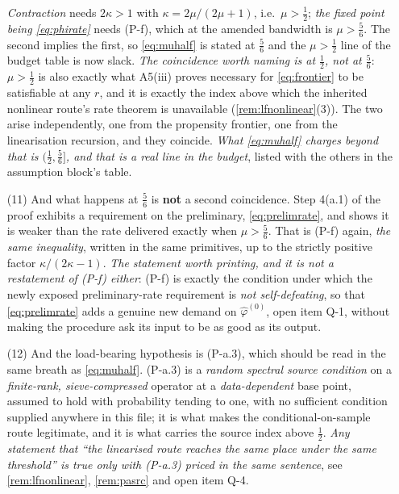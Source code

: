 \begin{remark}
\begin{enumerate}
\emph{Contraction} needs $2\kappa>1$ with $\kappa=2\mu/(2\mu+1)$, i.e.\ $\mu>\tfrac12$; \emph{the fixed
point being \eqref{eq:phirate}} needs (P-f), which at the amended bandwidth is $\mu>\tfrac56$. The second
implies the first, so \eqref{eq:muhalf} is stated at $\tfrac56$ and the $\mu>\tfrac12$ line of the budget
table is now slack. \emph{The coincidence worth naming is at $\tfrac12$, not at $\tfrac56$}:
$\mu>\tfrac12$ is also exactly what A5(iii) proves necessary for \eqref{eq:frontier} to be satisfiable at
any $r$, and it is exactly the index above which the inherited nonlinear route's rate theorem is
unavailable (\cref{rem:lfnonlinear}(3)). The two arise independently, one from the propensity
frontier, one from the linearisation recursion, and they coincide. \emph{What \eqref{eq:muhalf}
charges beyond that is $(\tfrac12,\tfrac56]$, and that is a real line in the budget}, listed with the
others in the assumption block's table.
\item[(11)] And what happens at $\tfrac56$ is \textbf{not} a second coincidence. Step 4(a.1) of
the proof exhibits a requirement on the preliminary, \eqref{eq:prelimrate}, and shows it is weaker than
the rate delivered exactly when $\mu>\tfrac56$. That is (P-f) again, \emph{the same inequality},
written in the same primitives, up to the strictly positive factor $\kappa/(2\kappa-1)$. \emph{The
statement worth printing, and it is not a restatement of (P-f) either}: (P-f) is exactly the condition
under which the newly exposed preliminary-rate requirement is \emph{not self-defeating}, so that
\eqref{eq:prelimrate} adds a genuine new demand on $\hat\varphi^{(0)}$, open item Q-1, without
making the procedure ask its input to be as good as its output.
\item[(12)] And the load-bearing hypothesis is \textup{(P-a.3)}, which should be read in the same
breath as \eqref{eq:muhalf}. (P-a.3) is a \emph{random spectral source condition} on a
\emph{finite-rank, sieve-compressed} operator at a \emph{data-dependent} base point, assumed to hold with
probability tending to one, with no sufficient condition supplied anywhere in this file; it is what makes
the conditional-on-sample route legitimate, and it is what carries the source index above $\tfrac12$.
\emph{Any statement that ``the linearised route reaches the same place under the same threshold'' is true
only with (P-a.3) priced in the same sentence}, see \cref{rem:lfnonlinear}, \cref{rem:pasrc} and open
item Q-4.
\end{enumerate}
\end{remark}

